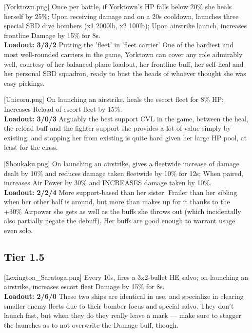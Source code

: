 [Yorktown.png]
{Once per battle, if Yorktown's HP falls below 20\% she heals herself by 25\%; Upon receiving damage and on a 20s cooldown, launches three special SBD dive bombers (x1 2000lb, x2 100lb); Upon airstrike launch, increases frontline Damage by 15\% for 8s.\\
\textbf{Loadout: 3/3/2}}
{Putting the 'fleet' in 'fleet carrier'}
{One of the hardiest and most well-rounded carriers in the game, Yorktown can cover any role admirably well, courtesy of her balanced plane loadout, her frontline buff, her self-heal and her personal SBD squadron, ready to bust the heads of whoever thought she was easy pickings.}

[Unicorn.png]
{On launching an airstrike, heals the escort fleet for 8\% HP; Increases Reload of escort fleet by 15\%.\\
\textbf{Loadout: 3/0/3}}
{}
{Arguably the best support CVL in the game, between the heal, the reload buff and the fighter support she provides a lot of value simply by existing; and stopping her from existing is quite hard given her large HP pool, at least for the class.}

[Shoukaku.png]
{On launching an airstrike, gives a fleetwide increase of damage dealt by 10\% and reduces damage taken fleetwide by 10\% for 12s; When paired, increases Air Power by 30\% and INCREASES damage taken by 10\%.\\
\textbf{Loadout: 2/2/4}}
{}
{More support-based than her sister. Frailer than her sibling when her other half is around, but more than makes up for it thanks to the +30\% Airpower she gets as well as the buffs she throws out (which incidentally also partially negate the debuff). Her buffs are good enough to warrant usage even solo.}
 
 
\newpage
\subsection{Tier 1.5}
[Lexington_Saratoga.png]
{Every 10s, fires a 3x2-bullet HE salvo; on launching an airstrike, increases escort fleet Damage by 15\% for 8s.\\
\textbf{Loadout: 2/6/0}}
{}
{These two ships are identical in use, and specialize in clearing smaller enemy fleets due to their bomber focus and special salvo. They don't launch fast, but when they do they really leave a mark --- make sure to stagger the launches as to not overwrite the Damage buff, though.}
 
